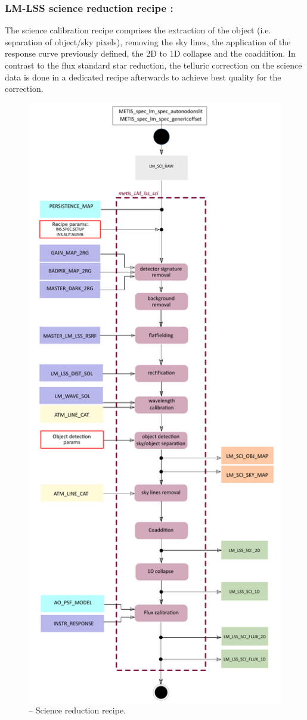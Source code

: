 \subsubsection{LM-LSS science reduction recipe :}
The science calibration recipe comprises the extraction of the object (i.e. separation of object/sky pixels), removing the sky lines, the application of the response curve previously defined, the 2D to 1D collapse and the coaddition. In contrast to the flux standard star reduction, the telluric correction on the science data is done in a dedicated recipe afterwards to achieve best quality for the correction.
\begin{figure}[ht]
  \centering
  \includegraphics[width=0.4\textheight]{figures/metis_lm_lss_sci_v0.70.pdf}
  \caption[Recipe: ]{ --
    Science reduction recipe.}
  \label{Fig:rec_lm_lss_sci}
\end{figure}
